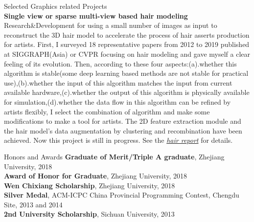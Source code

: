 \documentclass{resume} %
\makeatletter
\newcommand{\tabincell}[2]{\begin{tabular}{@{}#1@{}}#2\end{tabular}}
\makeatother
\begin{document}
\begin{rSection}{Selected Graphics related Projects}
  \\{\bf Single view or sparse multi-view based hair modeling}\\ Research\&Development for using a small number of images as input to reconstruct the 3D hair model to accelerate the process of hair asserts production for artists. First, I surveyed 18 representative papers from 2012 to 2019 published at SIGGRAPH(Asia) or CVPR focusing on hair modeling and gave myself a clear feeling of its evolution. Then, according to these four aspects:(a).whether this algorithm is stable(some deep learning based methods are not stable for practical use),(b).whether the input of this algorithm matches the input from current available hardware,(c).whether the output of this algorithm is physically available for simulation,(d).whether the data flow in this algorithm can be refined by artists flexibly, I select the combination of algorithm and make some modifications to make a tool for artists. The 2D feature extraction module and the hair model's data augmentation by clustering and recombination have been achieved. Now this project is still in progress. See the \emph{\href{https://wtyatzoo.github.io/reports/hair.pdf}{hair report}} for details. \\
                         
\end{rSection}

\begin{rSection}{Honors and Awards}
  \textbf{Graduate of Merit/Triple A graduate}, Zhejiang University, 2018\\
  \textbf{Award of Honor for Graduate}, Zhejiang University, 2018\\
  \textbf{Wen Chixiang Scholarship}, Zhejiang University, 2018\\
  \textbf{Silver Medal}, ACM-ICPC China Provincial Programming Contest, Chengdu Site, 2013 and 2014\\
  \textbf{2nd University Scholarship}, Sichuan University, 2013
\end{rSection}

{}
\end{document}
